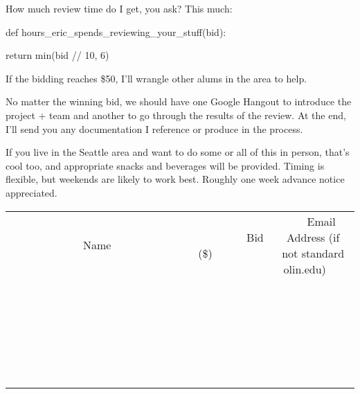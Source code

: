 \documentclass[11pt]{article}
\begin{document}
How much review time do I get, you ask? This much:



def hours\_eric\_spends\_reviewing\_your\_stuff(bid):

    return min(bid // 10, 6)



If the bidding reaches \$50, I'll wrangle other alums in the area to help.



No matter the winning bid, we should have one Google Hangout to introduce the project + team and another to go through the results of the review. At the end, I'll send you any documentation I reference or produce in the process.



If you live in the Seattle area and want to do some or all of this in person, that's cool too, and appropriate snacks and beverages will be provided. Timing is flexible, but weekends are likely to work best. Roughly one week advance notice appreciated. \\
					[6ex]
					\begin{tabular}{c c c}
						~~~~~~~~~~~~~Name~~~~~~~~~~~~~ & ~~~~~~~~~Bid (\$)~~~~~~~~~ & ~~~Email Address (if not standard olin.edu)~~~ \\
				
 & & \\
\hline
 & & \\
\hline
 & & \\
\hline
 & & \\
\hline
 & & \\
\hline
 & & \\
\hline
 & & \\
\hline
 & & \\
\hline
 & & \\
\hline
 & & \\
\hline
 & & \\
\hline
 & & \\
\hline
 & & \\
\hline
 & & \\
\hline
 & & \\
\hline
 & & \\
\hline
 & & \\
\hline
 & & \\
\hline
 & & \\
\hline
 & & \\
\hline
 & & \\
\hline
 & & \\
\hline
 & & \\
\hline
 & & \\
\hline
 & & \\
\hline
 & & \\
\hline
					\end{tabular}
					\clearpage
				
\end{document}
